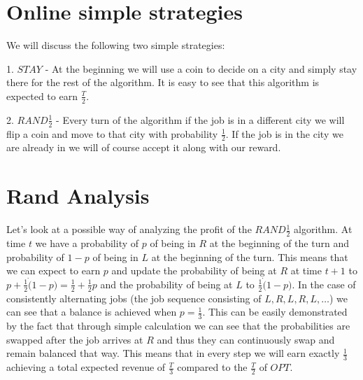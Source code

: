 \documentclass[]{article}
\newcommand{\rand}{ $ RAND \frac{1}{2} $ }
\begin{document}
\section{Online simple strategies}

We will discuss the following two simple strategies:

1. $ STAY $ - At the beginning we will use a coin to decide on a city and simply stay there for the rest of the algorithm. It is easy to see that this algorithm is expected to earn $ \frac{T}{2} $.

2. \rand - Every turn of the algorithm if the job is in a different city we will flip a coin and move to that city with probability $ \frac{1}{2} $. If the job is in the city we are already in we will of course accept it along with our reward.

\section{Rand Analysis}

Let's look at a possible way of analyzing the profit of the \rand algorithm. At time $ t $ we have a probability of $ p $ of being in $ R $ at the beginning of the turn and probability of $ 1 - p $ of being in $ L $ at the beginning of the turn. This means that we can expect to earn $ p $ and update the probability of being at $ R $ at time $ t + 1 $ to $ p + \frac{1}{2} \dot ( 1 - p ) = \frac{1}{2} + \frac{1}{2}p$ and the probability of being at $ L $ to $ \frac{1}{2} \dot ( 1 - p ) $. In the case of consistently alternating jobs (the job sequence consisting of $ L, R, L, R, L, \ldots $) we can see that a balance is achieved when $ p = \frac{1}{3} $. This can be easily demonstrated by the fact that through simple calculation we can see that the probabilities are swapped after the job arrives at $ R $ and thus they can continuously swap and remain balanced that way. This means that in every step we will earn exactly $ \frac{1}{3} $ achieving a total expected revenue of $ \frac{T}{3} $ compared to the $ \frac{T}{2} $ of $ OPT $.
\end{document}
